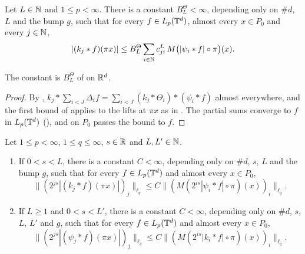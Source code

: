 \begin{theorem}
\label{thm:torus-local-means-by-blocks}
\leanok
{}
Let $L \in \mathbb{N}$ and $1 \leq p < \infty$. There is a constant $B^\Theta_L < \infty$, depending only
on $\#d$, $L$ and the bump $g$, such that for every $f \in L_p(\mathbb{T}^d)$, almost every $x \in P_0$
and every $j \in \mathbb{N}$,
\[
  |(k_j * f)(\pi x)| \leq B^\Theta_L \sum_{i \in \mathbb{N}} c^L_{ji} \,
  M\bigl(|\psi_i * f| \circ \pi\bigr)(x) .
\]
\end{theorem}

The constant is $B^\Theta_L$ of  on $\mathbb{R}^d$.

\begin{proof}
\leanok
By ,
$k_j * \sum_{i < J} \Delta_i f = \sum_{i < J} (k_j * \Theta_i) * (\psi_i * f)$ almost everywhere,
and the first bound of  applies to the lifts at $\pi x$ as in
. The partial sums converge to $f$ in $L_p(\mathbb{T}^d)$
(), and  on $P_0$ passes the bound to
$f$.
\end{proof}

\begin{lemma}
\label{lem:torus-tl-local-means-lq}
\leanok
{}
Let $1 \leq p < \infty$, $1 \leq q \leq \infty$, $s \in \mathbb{R}$ and $L, L' \in \mathbb{N}$.
\begin{enumerate}
  \item If $0 < s < L$, there is a constant $C < \infty$, depending only on $\#d$, $s$, $L$ and
    the bump $g$, such that for every $f \in L_p(\mathbb{T}^d)$ and almost every $x \in P_0$,
    \[
      \bigl\| (2^{js} |(k_j * f)(\pi x)|)_j \bigr\|_{\ell_q} \leq C
      \bigl\| (M(2^{is} |\psi_i * f| \circ \pi)(x))_i \bigr\|_{\ell_q} .
    \]
  \item If $L \geq 1$ and $0 < s < L'$, there is a constant $C < \infty$, depending only on
    $\#d$, $s$, $L$, $L'$ and $g$, such that for every $f \in L_p(\mathbb{T}^d)$ and almost every
    $x \in P_0$,
    \[
      \bigl\| (2^{js} |(\psi_j * f)(\pi x)|)_j \bigr\|_{\ell_q} \leq C
      \bigl\| (M(2^{is} |k_i * f| \circ \pi)(x))_i \bigr\|_{\ell_q} .
    \]
\end{enumerate}
\end{lemma}

